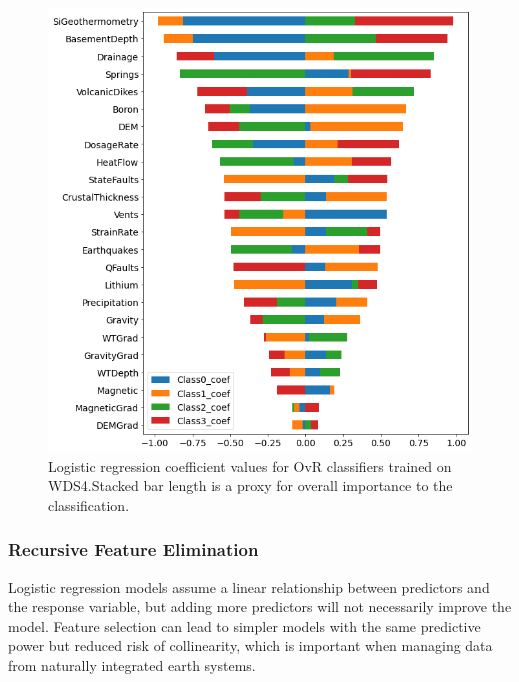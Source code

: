 \begin{figure}[!htp]
\centering
\includegraphics[width=\textwidth]{templates/images/Figure-LR-coefficients.png}
\singlespacing
\caption[Logistic regression feature coefficients]{Logistic regression coefficient values for OvR classifiers trained on WDS4.Stacked bar length is a proxy for overall importance to the classification.}
\label{fig:logreg_coefs}
\end{figure}

\subsubsection{Recursive Feature Elimination}
Logistic regression models assume a linear relationship between predictors and the response variable, but adding more predictors will not necessarily improve the model. Feature selection can lead to simpler models with the same predictive power but reduced risk of collinearity, which is important when managing data from naturally integrated earth systems. 

